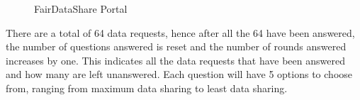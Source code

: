 \begin{figure}[htp]
  \hspace{1em}
  \caption{FairDataShare Portal}
  \label{fig:bid}
\end{figure}


There are a total of 64 data requests, hence after all the 64 have been answered, the number of questions answered is reset and the number of rounds answered increases by one. This indicates all the data requests that have been answered and how many are left unanswered. Each question will have 5 options to choose from, ranging from maximum data sharing to least data sharing.

